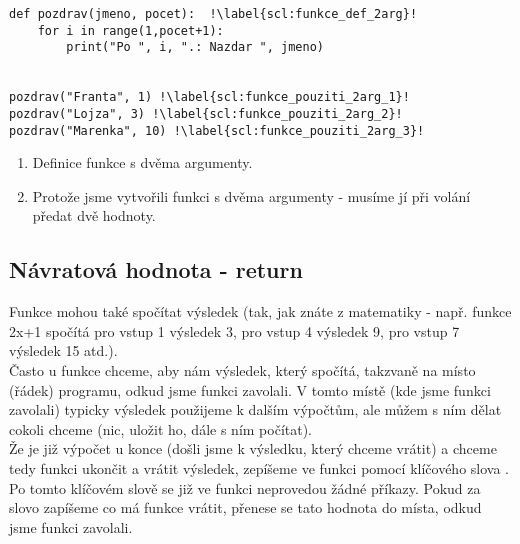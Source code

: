 \begin{minipage}[t]{.45\textwidth}
\begin{code}
\begin{verbatim}
def pozdrav(jmeno, pocet):	!\label{scl:funkce_def_2arg}!
	for i in range(1,pocet+1):
		print("Po ", i, ".: Nazdar ", jmeno)
	
	
pozdrav("Franta", 1) !\label{scl:funkce_pouziti_2arg_1}!
pozdrav("Lojza", 3) !\label{scl:funkce_pouziti_2arg_2}!
pozdrav("Marenka", 10) !\label{scl:funkce_pouziti_2arg_3}!
\end{verbatim}

\label{code:funkce_2arg}
\end{code}
\end{minipage}
\begin{minipage}[t]{.45\textwidth}
\begin{enumerate}
\vspace{1.5cm}
\item[ř. \ref{scl:funkce_def}:] Definice funkce s dvěma argumenty.
\item[ř. \ref{scl:funkce_pouziti_2arg_1}, \ref{scl:funkce_pouziti_2arg_2}, \ref{scl:funkce_pouziti_2arg_3}:] Protože jsme vytvořili funkci s dvěma argumenty - musíme jí při volání předat dvě hodnoty.
\end{enumerate}
\end{minipage}

\subsection{Návratová hodnota - return}
Funkce mohou také spočítat výsledek (tak, jak znáte z matematiky - např. funkce 2x+1 spočítá pro vstup 1 výsledek 3, pro vstup 4 výsledek 9, pro vstup 7 výsledek 15 atd.).\\
Často u funkce chceme, aby nám výsledek, který spočítá, takzvaně  na místo (řádek) programu, odkud jsme funkci zavolali. V tomto místě (kde jsme funkci zavolali) typicky výsledek použijeme k dalším výpočtům, ale můžem s ním dělat cokoli chceme (nic, uložit ho, dále s ním počítat).\\
Že je již výpočet u konce (došli jsme k výsledku, který chceme vrátit) a chceme tedy funkci ukončit a vrátit výsledek, zepíšeme ve funkci pomocí klíčového slova . Po tomto klíčovém slově se již ve funkci neprovedou žádné příkazy. Pokud za slovo  zapíšeme co má funkce vrátit, přenese se tato hodnota do místa, odkud jsme funkci zavolali.\\

